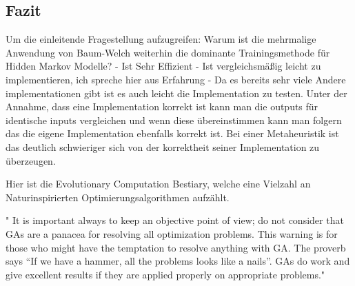 \subsection*{Fazit}
Um die einleitende Fragestellung aufzugreifen: Warum ist die mehrmalige Anwendung von Baum-Welch weiterhin die dominante Trainingsmethode für Hidden Markov Modelle?
- Ist Sehr Effizient
- Ist vergleichsmäßig leicht zu implementieren, ich spreche hier aus Erfahrung
- Da es bereits sehr viele Andere implementationen gibt ist es auch leicht die Implementation zu testen. Unter der Annahme, dass eine Implementation korrekt ist kann man die outputs für identische inputs vergleichen und wenn diese übereinstimmen kann man folgern das die eigene Implementation ebenfalls korrekt ist. Bei einer Metaheuristik ist das deutlich schwieriger sich von der korrektheit seiner Implementation zu überzeugen.

Hier ist die Evolutionary Computation Bestiary, welche eine Vielzahl an Naturinspirierten Optimierungsalgorithmen aufzählt.



" It is important always to keep an objective point of view;
do not consider that GAs are a panacea for resolving all optimization problems.
This warning is for those who might have the temptation to resolve anything with
GA. The proverb says “If we have a hammer, all the problems looks like a nails”.
GAs do work and give excellent results if they are applied properly on appropriate
problems." \cite*{GeneticAlgorithms}
